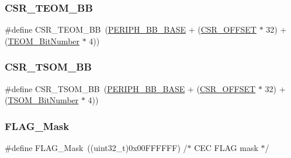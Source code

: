 \mbox{\label{group___c_e_c___private___defines_ga9ac493d98ce1f6d82b778ace0f2bc7bb}} 
\subsubsection{\texorpdfstring{CSR\_TEOM\_BB}{CSR\_TEOM\_BB}}
{\footnotesize\ttfamily \#define C\+S\+R\+\_\+\+T\+E\+O\+M\+\_\+\+BB~(\mbox{\hyperlink{group___peripheral__memory__map_gaed7efc100877000845c236ccdc9e144a}{P\+E\+R\+I\+P\+H\+\_\+\+B\+B\+\_\+\+B\+A\+SE}} + (\mbox{\hyperlink{group___r_c_c___private___defines_ga984cbe73312b6d3d355c5053763d499a}{C\+S\+R\+\_\+\+O\+F\+F\+S\+ET}} $\ast$ 32) + (\mbox{\hyperlink{group___c_e_c___private___defines_gac86378eff7728e5cfca5480ab2dbef0b}{T\+E\+O\+M\+\_\+\+Bit\+Number}} $\ast$ 4))}

\mbox{\label{group___c_e_c___private___defines_ga4971cc50b0ead4a493e2a9c03966c826}} 
\subsubsection{\texorpdfstring{CSR\_TSOM\_BB}{CSR\_TSOM\_BB}}
{\footnotesize\ttfamily \#define C\+S\+R\+\_\+\+T\+S\+O\+M\+\_\+\+BB~(\mbox{\hyperlink{group___peripheral__memory__map_gaed7efc100877000845c236ccdc9e144a}{P\+E\+R\+I\+P\+H\+\_\+\+B\+B\+\_\+\+B\+A\+SE}} + (\mbox{\hyperlink{group___r_c_c___private___defines_ga984cbe73312b6d3d355c5053763d499a}{C\+S\+R\+\_\+\+O\+F\+F\+S\+ET}} $\ast$ 32) + (\mbox{\hyperlink{group___c_e_c___private___defines_ga1a470abab836eba7b451950938708946}{T\+S\+O\+M\+\_\+\+Bit\+Number}} $\ast$ 4))}

\mbox{\label{group___c_e_c___private___defines_ga2be62bf481cd44de9ab604efe5595ff6}} 
\subsubsection{\texorpdfstring{FLAG\_Mask}{FLAG\_Mask}}
{\footnotesize\ttfamily \#define F\+L\+A\+G\+\_\+\+Mask~((uint32\+\_\+t)0x00\+F\+F\+F\+F\+F\+F) /$\ast$ C\+E\+C F\+L\+A\+G mask $\ast$/}

